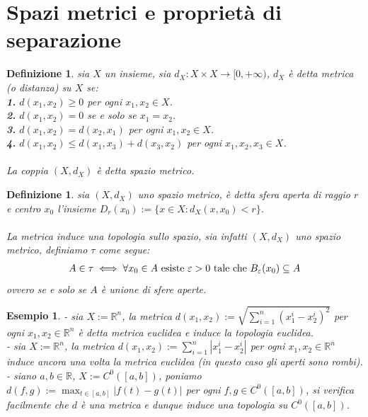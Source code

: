 \documentclass[oneside, 11pt]{amsbook}
\newcommand{\0}{{(0)}}
\newcommand{\3}{{(3)}}
\theoremstyle{colonplain}
\theoremstyle{colondefinition}
\newtheorem{defn}[thm]{Definizione}
\newtheorem{ex}[thm]{Esempio}
\theoremstyle{colonremark}
\numberwithin{equation}{chapter}
\begin{document}
\section{Spazi metrici e proprietà di separazione}
\begin{defn}
sia $X$ un insieme, sia $d_X : X \times X \longrightarrow [0, + \infty)$, $d_X$ è detta \textit{metrica} (o \textit{distanza}) su $X$ se: \\
\textbf{1.} $d(x_1, x_2) \geq 0$ per ogni $x_1, x_2 \in X$. \\
\textbf{2.} $d(x_1, x_2) = 0$ se e solo se $x_1 = x_2$. \\
\textbf{3.} $d(x_1, x_2) = d(x_2, x_1)$ per ogni $x_1, x_2 \in X$. \\
\textbf{4.} $d(x_1, x_2) \leq d(x_1, x_3) + d(x_3, x_2)$ per ogni $x_1, x_2, x_3 \in X$. \\ \\
La coppia $(X, d_X)$ è detta \textit{spazio metrico}.
\end{defn}
\begin{defn}
sia $(X, d_X)$ uno spazio metrico, è detta \textit{sfera aperta di raggio $r$ e centro $x_0$} l'insieme $D_r(x_0) := \{ x \in X : d_X(x, x_0) < r \}$. \\ \\
La metrica induce una topologia sullo spazio, sia infatti $(X, d_X)$ uno spazio metrico, definiamo $\tau$ come segue:
\begin{align}
    A \in \tau \iff \forall x_0 \in A \text{ esiste } \varepsilon > 0 \text{ tale che } B_\varepsilon(x_0) \subseteq A \notag
\end{align}
ovvero se e solo se $A$ è unione di sfere aperte.
\end{defn}
\begin{ex}
- sia $X := \mathbb{R}^n$, la metrica $d(x_1, x_2) := \sqrt{\sum_{i = 1}^n (x_1^i - x_2^i)^2}$ per ogni $x_1, x_2 \in \mathbb{R}^n$ è detta \textit{metrica euclidea} e induce la topologia euclidea. \\
- sia $X := \mathbb{R}^n$, la metrica $d(x_1, x_2) := \sum_{i = 1}^n |x_1^i - x_2^i|$ per ogni $x_1, x_2 \in \mathbb{R}^n$ induce ancora una volta la metrica euclidea (in questo caso gli aperti sono rombi). \\
- siano $a, b \in \mathbb{R}$, $X := C^0([a, b])$, poniamo $d(f, g) := \max_{t \in [a, b]} |f(t) - g(t)|$ per ogni $f, g \in C^0([a, b])$, si verifica facilmente che $d$ è una metrica e dunque induce una topologia su $C^0([a, b])$.
\end{ex}
\end{document}
